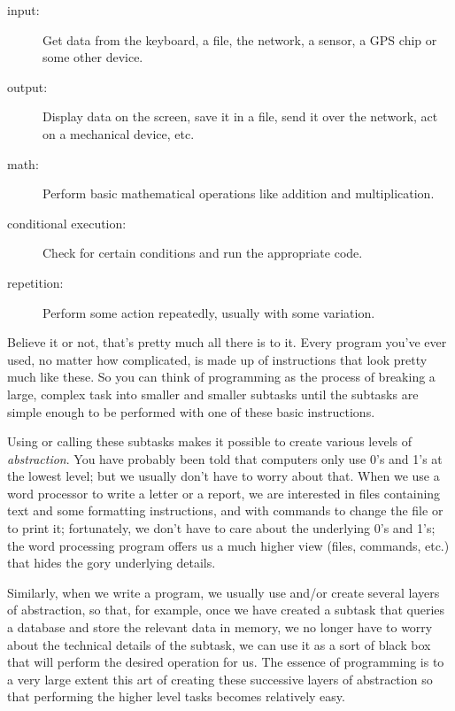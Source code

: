 \begin{description}

\item[input:] Get data from the keyboard, a file, the network, 
a sensor, a GPS chip or some other device.

\item[output:] Display data on the screen, save it in a
file, send it over the network, act on a mechanical device,  etc.

\item[math:] Perform basic mathematical operations like addition and
multiplication.

\item[conditional execution:] Check for certain conditions and
run the appropriate code.

\item[repetition:] Perform some action repeatedly, usually with
some variation.

\end{description}

Believe it or not, that's pretty much all there is to it.  Every
program you've ever used, no matter how complicated, is made up of
instructions that look pretty much like these.  So you can think of
programming as the process of breaking a large, complex task
into smaller and smaller subtasks until the subtasks are
simple enough to be performed with one of these basic instructions.

Using or calling these subtasks makes it possible to create 
various levels of \emph{abstraction}. You have probably 
been told that computers only use 0's and 1's at the 
lowest level; but we usually don't have to worry about that. 
When we use a word processor to write a letter or a report, 
we are interested in files containing text and some 
formatting instructions, and with commands to change the 
file or to print it; fortunately, we don't have to 
care about the underlying 0's and 1's; the word 
processing program offers us a much higher view (files, 
commands, etc.) that hides the gory underlying details.

Similarly, when we write a program, 
we usually use and/or create several layers of abstraction, 
so that, for example, once we have created a subtask that 
queries a database and store the relevant data in 
memory, we no longer have to worry about the technical 
details of the subtask, we can use it as a sort of black 
box that will perform the desired operation for us. 
The essence of programming is to a very large extent this 
art of creating these successive layers of abstraction 
so that performing the higher level tasks becomes 
relatively easy.


